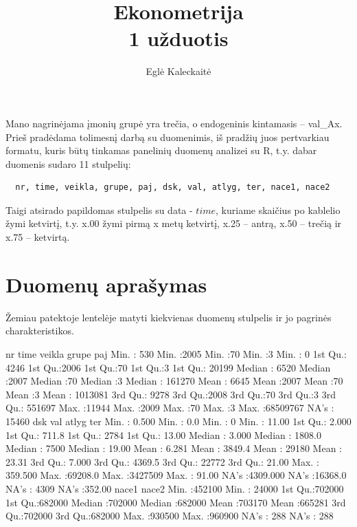 \documentclass[a4paper]{article}
\title{Ekonometrija \\1 užduotis}
\author{Eglė Kaleckaitė}
\newcommand{\R}{R}
\begin{document}
\maketitle

Mano nagrinėjama įmonių grupė yra trečia, o endogeninis kintamasis --
val\_Ax. Prieš pradėdama tolimesnį darbą su duomenimis, iš pradžių
juos pertvarkiau formatu, kuris būtų tinkamas panelinių duomenų
analizei su \R{}, t.y. dabar duomenis sudaro 11 stulpelių:
\begin{verbatim}
  nr, time, veikla, grupe, paj, dsk, val, atlyg, ter, nace1, nace2
\end{verbatim}

Taigi atsirado papildomas stulpelis su data - $time$, kuriame skaičius
po kablelio žymi ketvirtį, t.y. x.00 žymi pirmą x metų ketvirtį, x.25
-- antrą, x.50 -- trečią ir x.75 -- ketvirtą.
\section{Duomenų aprašymas}

Žemiau patektoje lentelėje matyti kiekvienas duomenų stulpelis ir jo
pagrinės charakteristikos.
\begin{Schunk}
\begin{Soutput}
       nr             time          veikla       grupe        paj          
 Min.   :  530   Min.   :2005   Min.   :70   Min.   :3   Min.   :       0  
 1st Qu.: 4246   1st Qu.:2006   1st Qu.:70   1st Qu.:3   1st Qu.:   20199  
 Median : 6520   Median :2007   Median :70   Median :3   Median :  161270  
 Mean   : 6645   Mean   :2007   Mean   :70   Mean   :3   Mean   : 1013081  
 3rd Qu.: 9278   3rd Qu.:2008   3rd Qu.:70   3rd Qu.:3   3rd Qu.:  551697  
 Max.   :11944   Max.   :2009   Max.   :70   Max.   :3   Max.   :68509767  
                                                         NA's   :   15460  
      dsk                val              atlyg              ter        
 Min.   :   0.500   Min.   :    0.0   Min.   :      0   Min.   : 11.00  
 1st Qu.:   2.000   1st Qu.:  711.8   1st Qu.:   2784   1st Qu.: 13.00  
 Median :   3.000   Median : 1808.0   Median :   7500   Median : 19.00  
 Mean   :   6.281   Mean   : 3849.4   Mean   :  29180   Mean   : 23.31  
 3rd Qu.:   7.000   3rd Qu.: 4369.5   3rd Qu.:  22772   3rd Qu.: 21.00  
 Max.   : 359.500   Max.   :69208.0   Max.   :3427509   Max.   : 91.00  
 NA's   :4309.000   NA's   :16368.0   NA's   :   4309   NA's   :352.00  
     nace1            nace2       
 Min.   :452100   Min.   : 24000  
 1st Qu.:702000   1st Qu.:682000  
 Median :702000   Median :682000  
 Mean   :703170   Mean   :665281  
 3rd Qu.:702000   3rd Qu.:682000  
 Max.   :930500   Max.   :960900  
 NA's   :   288   NA's   :   288  
\end{Soutput}
\end{Schunk}
\end{document}
